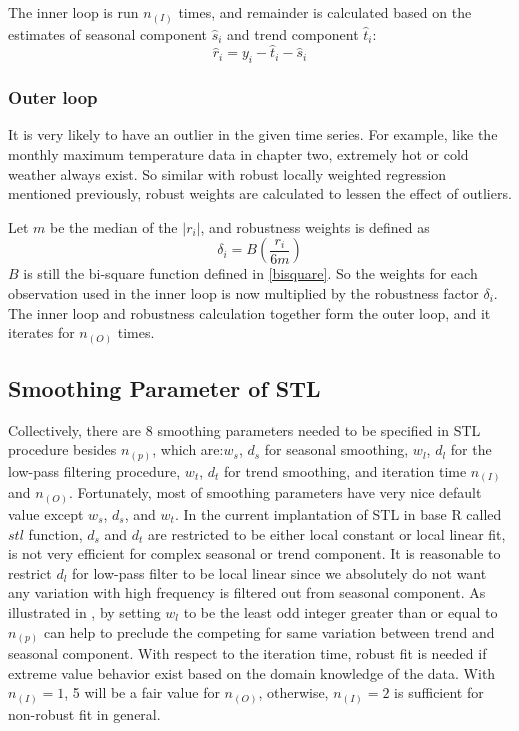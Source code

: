 The inner loop is run $n_{(I)}$ times, and remainder is calculated based on the
estimates of seasonal component $\hat s_i$ and trend component $\hat t_i$:
\begin{equation} 
\hat r_i = y_i - \hat t_i - \hat s_i
\end{equation}

\subsubsection{Outer loop}

It is very likely to have an outlier in the given time series. For example, like
the monthly maximum temperature data in chapter two, extremely hot or cold weather 
always exist. So similar with robust locally weighted regression mentioned 
previously, robust weights are calculated to lessen the effect of outliers.

Let $m$ be the median of the $|r_i|$, and robustness weights is defined as
\begin{equation}
\delta_i = B\left(\frac{r_i}{6m}\right)
\end{equation}
$B$ is still the bi-square function defined in \ref{bisquare}. So the weights
for each observation used in the inner loop is now multiplied by the robustness
factor $\delta_i$. The inner loop and robustness calculation together form the
outer loop, and it iterates for $n_{(O)}$ times.

\subsection{Smoothing Parameter of STL}

Collectively, there are 8 smoothing parameters needed to be specified in STL
procedure besides $n_{(p)}$, which are:$w_s$, $d_s$ for seasonal smoothing, 
$w_l$, $d_l$ for the low-pass filtering procedure, $w_t$, $d_t$ for trend 
smoothing, and iteration time $n_{(I)}$ and $n_{(O)}$. Fortunately, most of 
smoothing parameters have very nice default value except $w_s$, $d_s$, and $w_t$.
In the current implantation of STL in base R called $stl$ function, $d_s$ and 
$d_t$ are restricted to be either local constant or local linear fit, is not very
efficient for complex seasonal or trend component. It is reasonable to restrict
$d_l$ for low-pass filter to be local linear since we absolutely do not want any
variation with high frequency is filtered out from seasonal component. As 
illustrated in \cite{Cleveland:1990}, by setting $w_l$ to be the least odd integer 
greater than or equal to $n_{(p)}$ can help to preclude the competing for same
variation between trend and seasonal component. With respect to the iteration time,
robust fit is needed if extreme value behavior exist based on the domain knowledge
of the data. With $n_{(I)}=1$, 5 will be a fair value for $n_{(O)}$, otherwise,
$n_{(I)}=2$ is sufficient for non-robust fit in general.

